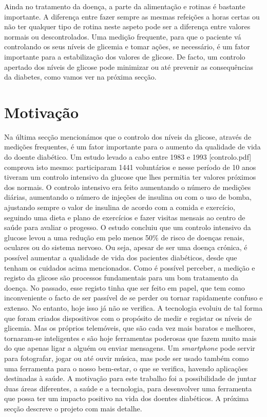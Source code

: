 Ainda no tratamento da doença, a parte da alimentação e rotinas é bastante importante. A diferença entre fazer sempre as mesmas refeições a horas certas ou não ter qualquer tipo de rotina neste aspeto pode ser a diferença entre valores normais ou descontrolados. Uma medição frequente, para que o paciente vá controlando os seus níveis de glicemia e tomar ações, se necessário, é um fator importante para a estabilização dos valores de glicose. 
De facto, um controlo apertado dos níveis de glicose pode minimizar ou até prevenir as consequências da diabetes, como vamos ver na próxima secção.



\section{Motivação}

Na última secção mencionámos que o controlo dos níveis da glicose, através de medições frequentes, é um fator importante para o aumento da qualidade de vida do doente diabético. Um estudo levado a cabo entre 1983 e 1993 [controlo.pdf] comprova isto mesmo: participaram 1441 voluntários e nesse período de 10 anos tiveram um controlo intensivo da glucose que lhes permitia ter valores próximos dos normais. O controlo intensivo era feito aumentando o número de medições diárias, aumentando o número de injeções de insulina ou com o uso de bomba, ajustando sempre o valor de insulina de acordo com a comida e exercício, seguindo uma dieta e plano de exercícios e fazer visitas mensais ao centro de saúde para avaliar o progesso. O estudo concluiu que um controlo intensivo da glucose levou a uma redução em pelo menos 50\% de risco de doenças renais, oculares ou do sistema nervoso. 
Ou seja, apesar de ser uma doença crónica, é possível aumentar a qualidade de vida dos pacientes diabéticos, desde que tenham os cuidados acima mencionados. 
Como é possível perceber, a medição e registo da glicose são processos fundamentais para um bom tratamento da doença. No passado, esse registo tinha que ser feito em papel, que tem como inconveniente o facto de ser passível de se perder ou tornar rapidamente confuso e extenso. No entanto, hoje isso já não se verifica.
A tecnologia evoluiu de tal forma que foram criados dispositivos com o propósito de medir e registar os níveis de glicemia. Mas os próprios telemóveis, que são cada vez mais baratos e melhores, tornaram-se inteligentes e são hoje ferramentas poderosas que fazem muito mais do que apenas ligar a alguém ou enviar mensagens. 
Um \textit{smartphone} pode servir para fotografar, jogar ou até ouvir música, mas pode ser usado também como uma ferramenta para o nosso bem-estar, o que se verifica, havendo aplicações destinadas à saúde. A motivação para este trabalho foi a possibilidade de juntar duas áreas diferentes, a saúde e a tecnologia, para desenvolver uma ferramenta que possa ter um impacto positivo na vida dos doentes diabéticos. A próxima secção descreve o projeto com mais detalhe.


